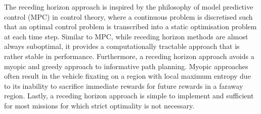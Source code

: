		The receding horizon approach is inspired by the philosophy of model predictive control (MPC) in control theory, where a continuous problem is discretised such that an optimal control problem is transcribed into a static optimisation problem at each time step. Similar to MPC, while receding horizon methods are almost always suboptimal, it provides a computationally tractable approach that is rather stable in performance. Furthermore, a receding horizon approach avoids a myopic and greedy approach to informative path planning. Myopic approaches often result in the vehicle fixating on a region with local maximum entropy due to its inability to sacrifice immediate rewards for future rewards in a faraway region. Lastly, a receding horizon approach is simple to implement and sufficient for most missions for which strict optimality is not necessary.
		
		
